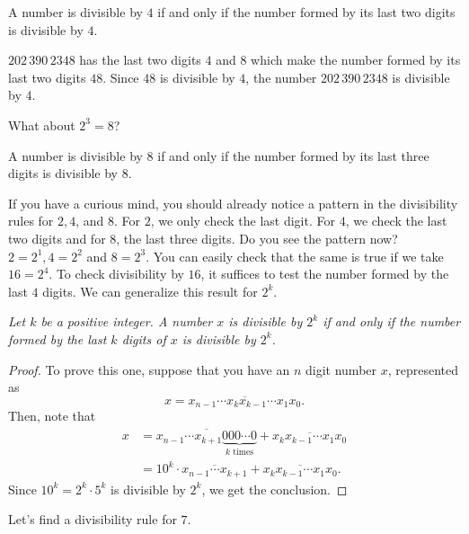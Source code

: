 \documentclass{subfile}
\begin{document}
\begin{proposition}[Divisibility by $4$]
	A number is divisible by $4$ if and only if the number formed by its last two digits is divisible by $4$.
\end{proposition}

\begin{example}
	$202\, 390\, 2348$ has the last two digits $4$ and $8$ which make the number formed by its last two digits $48$. Since $48$ is divisible by $4$, the number $202\, 390\, 2348$ is divisible by $4$.
\end{example}

What about $2^3=8$?

\begin{proposition}[Divisibility by $8$]
	A number is divisible by $8$ if and only if the number formed by its last three digits is divisible by $8$.
\end{proposition}

If you have a curious mind, you should already notice a pattern in the divisibility rules for $2,4$, and $8$. For $2$, we only check the last digit. For $4$, we check the last two digits and for $8$, the last three digits. Do you see the pattern now? $2=2^1,4=2^2$ and $8=2^3$. You can easily check that the same is true if we take $16=2^4$. To check divisibility by $16$, it suffices to test the number formed by the last $4$ digits. We can generalize this result for $2^k$.

\begin{theorem}[Divisibility by $2^k$]\slshape
	Let $k$ be a positive integer. A number $x$ is divisible by $2^k$ if and only if the number formed by the last $k$ digits of $x$ is divisible by $2^k$.
\end{theorem}

\begin{proof}
	To prove this one, suppose that you have an $n$ digit number $x$, represented as $$x = \overline{x_{n-1} \cdots x_k x_{k-1} \cdots x_1 x_0 }.$$ Then, note that
	\begin{align*}
		x &= \overline{x_{n-1} \cdots x_{k+1} \underbrace{000\cdots 0}_{k \text{ times}}} + \overline{x_k x_{k-1} \cdots x_1 x_0} \\
		&= 10^k \cdot \overline{x_{n-1} \cdots x_{k+1}} +  \overline{x_k x_{k-1} \cdots x_1 x_0}.
	\end{align*}
	Since $10^k=2^k \cdot 5^k$ is divisible by $2^k$, we get the conclusion.
\end{proof}

Let's find a divisibility rule for $7$.
\end{document}
